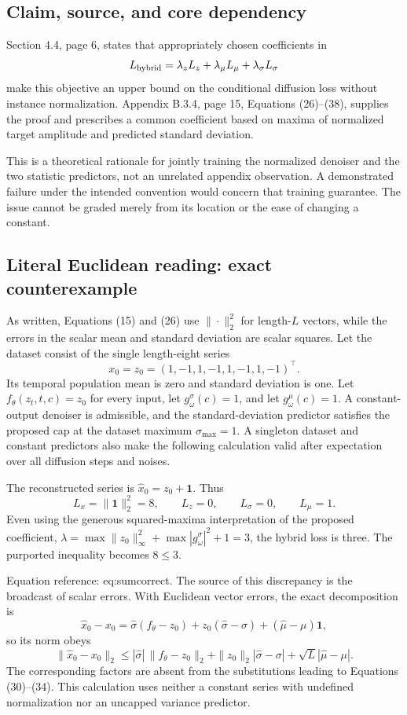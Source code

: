 \documentclass[10pt]{article}
\begin{document}
\subsection*{Claim, source, and core dependency}
Section 4.4, page 6, states that appropriately chosen coefficients in \[L_{\rm hybrid}=\lambda_z L_z+\lambda_\mu L_\mu+\lambda_\sigma L_\sigma\] make this objective an upper bound on the conditional diffusion loss without instance normalization. Appendix B.3.4, page 15, Equations (26)–(38), supplies the proof and prescribes a common coefficient based on maxima of normalized target amplitude and predicted standard deviation.\par
This is a theoretical rationale for jointly training the normalized denoiser and the two statistic predictors, not an unrelated appendix observation. A demonstrated failure under the intended convention would concern that training guarantee. The issue cannot be graded merely from its location or the ease of changing a constant.\par
\subsection*{Literal Euclidean reading: exact counterexample}
As written, Equations (15) and (26) use \(\|\cdot\|_2^2\) for length-\(L\) vectors, while the errors in the scalar mean and standard deviation are scalar squares. Let the dataset consist of the single length-eight series \[x_0=z_0=(1,-1,1,-1,1,-1,1,-1)^\top.\] Its temporal population mean is zero and standard deviation is one. Let \(f_\theta(z_t,t,c)=z_0\) for every input, let \(g^\sigma_\omega(c)=1\), and let \(g^\mu_\omega(c)=1\). A constant-output denoiser is admissible, and the standard-deviation predictor satisfies the proposed cap at the dataset maximum \(\sigma_{\max}=1\). A singleton dataset and constant predictors also make the following calculation valid after expectation over all diffusion steps and noises.\par
The reconstructed series is \(\widehat x_0=z_0+\mathbf 1\). Thus \[L_x=\|\mathbf 1\|_2^2=8,\qquad L_z=0,\qquad
L_\sigma=0,\qquad L_\mu=1.\] Even using the generous squared-maxima interpretation of the proposed coefficient, \(\lambda=\max\|z_0\|_\infty^2+\max|g^\sigma_\omega|^2+1=3\), the hybrid loss is three. The purported inequality becomes \(8\leq3\).\par
Equation reference: eq:sumcorrect. The source of this discrepancy is the broadcast of scalar errors. With Euclidean vector errors, the exact decomposition is \[\widehat x_0-x_0=
\widehat\sigma(f_\theta-z_0)+z_0(\widehat\sigma-\sigma)
 +(\widehat\mu-\mu)\mathbf 1,\] so its norm obeys \[
\|\widehat x_0-x_0\|_2
\leq |\widehat\sigma|\,\|f_\theta-z_0\|_2
 +\|z_0\|_2|\widehat\sigma-\sigma|
 +\sqrt L|\widehat\mu-\mu|.\] The corresponding factors are absent from the substitutions leading to Equations (30)–(34). This calculation uses neither a constant series with undefined normalization nor an uncapped variance predictor.\par
\end{document}
